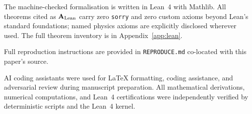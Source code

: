 \documentclass[11pt]{article}
\theoremstyle{remark}
\newcommand{\CatAL}{\ensuremath{\textbf{A}_{\rm Lean}}}
\begin{document}
The machine-checked formalisation is written in Lean~4 with Mathlib.
All theorems cited as $\CatAL$ carry zero \texttt{sorry} and zero custom
axioms beyond Lean's standard foundations; named physics axioms are explicitly
disclosed wherever used.  The full theorem inventory is in
Appendix~\ref{app:lean}.

Full reproduction instructions are provided in \texttt{REPRODUCE.md} co-located with this paper's source.

AI coding assistants were used for LaTeX formatting, coding assistance, and adversarial review during manuscript preparation. All mathematical derivations, numerical computations, and Lean~4 certifications were independently verified by deterministic scripts and the Lean~4 kernel.



\end{document}
